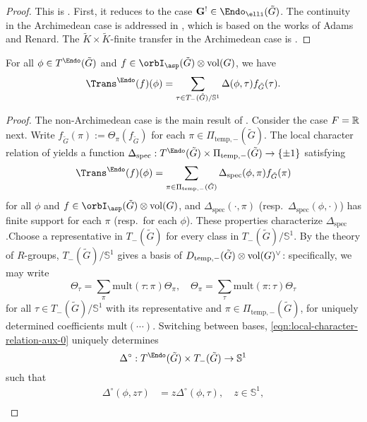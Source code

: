 \documentclass[12pt, a3paper, openany]{book}
\begin{document}
\begin{proof}
    This is \cite[Théorème 5.20]{Li11}. First, it reduces to the case $\mathbf{G}^! \in \Endo_{\elli}(\tilde{G})$. The continuity in the Archimedean case is addressed in \cite[\S 7.1]{Li19}, which is based on the works of Adams and Renard. The $\tilde{K} \times \tilde{K}$-finite transfer in the Archimedean case is \cite[Theorem 7.4.5]{Li19}.
\end{proof}
\begin{Lem}
For all $\phi \in T^{\Endo}(\tilde{G})$ and $f \in \orbI_{\asp}(\tilde{G}) \otimes \mes(G)$, we have\[ \Trans^{\Endo}(f)(\phi) = \sum_{\tau \in T_-(\tilde{G})/\mathbb{S}^1} \Delta(\phi, \tau) f_{\tilde{G}}(\tau).\]
\end{Lem}
\begin{proof}
The non-Archimedean case is the main result of \cite{Li19}. Consider the case $F = \mathbb{R}$ next.
Write $f_{\tilde{G}}(\pi) := \Theta_\pi(f_{\tilde{G}})$ for each $\pi \in \Pi_{\mathrm{temp}, -}(\tilde{G})$. The local character relation of \cite[Theorem 7.4.3]{Li19} yields a function $\Delta_{\mathrm{spec}}: T^{\Endo}(\tilde{G}) \times \Pi_{\mathrm{temp}, -}(\tilde{G}) \to \{\pm 1\}$ satisfying
\begin{equation}\label{eqn:local-character-relation-aux-0}
    \Trans^{\Endo}(f)(\phi) = \sum_{\pi \in \Pi_{\mathrm{temp}, -}(\tilde{G})} \Delta_{\mathrm{spec}}(\phi, \pi) f_{\tilde{G}}(\pi)
\end{equation}
for all $\phi$ and $f \in \orbI_{\asp}(\tilde{G}) \otimes \mes(G)$, and $\Delta_{\mathrm{spec}}(\cdot, \pi)$ (resp.\ $\Delta_{\mathrm{spec}}(\phi, \cdot)$) has finite support for each $\pi$ (resp.\ for each $\phi$). These properties characterize $\Delta_{\mathrm{spec}}$.Choose a representative in $T_-(\tilde{G})$ for every class in $T_-(\tilde{G})/\mathbb{S}^1$. By the theory of $R$-groups, $T_-(\tilde{G})/\mathbb{S}^1$ gives a basis of $D_{\mathrm{temp}, -}(\tilde{G}) \otimes \operatorname{vol}(G)^\vee$: specifically, we may write
\[ \Theta_\tau = \sum_\pi \mathrm{mult}(\tau : \pi) \Theta_\pi, \quad \Theta_\pi = \sum_\tau \mathrm{mult}(\pi : \tau) \Theta_\tau \]
for all $\tau \in T_-(\tilde{G})/\mathbb{S}^1$ with its representative and $\pi \in \Pi_{\mathrm{temp}, -}(\tilde{G})$, for uniquely determined coefficients $\mathrm{mult}(\cdots)$. Switching between bases, \eqref{eqn:local-character-relation-aux-0} uniquely determines
	\[ \Delta^\circ: T^{\Endo}(\tilde{G}) \times T_-(\tilde{G}) \to \mathbb{S}^1 \]such that
\begin{align*}
	\Delta^\circ(\phi, z\tau) & = z\Delta^\circ(\phi, \tau), \quad z \in \mathbb{S}^1 , \\

\end{align*}
\end{proof}
\end{document}
